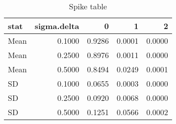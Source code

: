 \begin{table}[ht]
\centering
\begin{tabular}{lrrrr}
  \hline
stat & sigma.delta & 0 & 1 & 2 \\ 
  \hline
Mean & 0.1000 & 0.9286 & 0.0001 & 0.0000 \\ 
  Mean & 0.2500 & 0.8976 & 0.0011 & 0.0000 \\ 
  Mean & 0.5000 & 0.8494 & 0.0249 & 0.0001 \\ 
  SD & 0.1000 & 0.0655 & 0.0003 & 0.0000 \\ 
  SD & 0.2500 & 0.0920 & 0.0068 & 0.0000 \\ 
  SD & 0.5000 & 0.1251 & 0.0566 & 0.0002 \\ 
   \hline
\end{tabular}
\caption{Spike table} 
\end{table}
